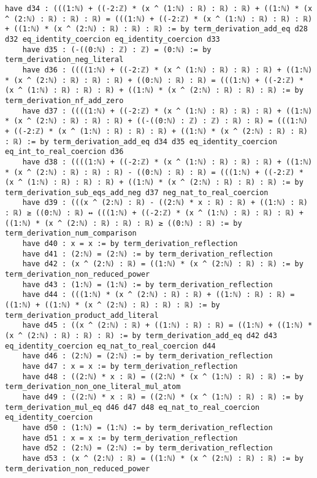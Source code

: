\documentclass{article}
\begin{document}
\begin{tcolorbox}[colback=white!10, width=\linewidth]
\begin{lstlisting}[language=Lean4]
    have d34 : (((1:ℕ) + ((-2:ℤ) * (x ^ (1:ℕ) : ℝ) : ℝ) : ℝ) + ((1:ℕ) * (x ^ (2:ℕ) : ℝ) : ℝ) : ℝ) = (((1:ℕ) + ((-2:ℤ) * (x ^ (1:ℕ) : ℝ) : ℝ) : ℝ) + ((1:ℕ) * (x ^ (2:ℕ) : ℝ) : ℝ) : ℝ) := by term_derivation_add_eq d28 d32 eq_identity_coercion eq_identity_coercion d33
    have d35 : (-((0:ℕ) : ℤ) : ℤ) = (0:ℕ) := by term_derivation_neg_literal
    have d36 : ((((1:ℕ) + ((-2:ℤ) * (x ^ (1:ℕ) : ℝ) : ℝ) : ℝ) + ((1:ℕ) * (x ^ (2:ℕ) : ℝ) : ℝ) : ℝ) + ((0:ℕ) : ℝ) : ℝ) = (((1:ℕ) + ((-2:ℤ) * (x ^ (1:ℕ) : ℝ) : ℝ) : ℝ) + ((1:ℕ) * (x ^ (2:ℕ) : ℝ) : ℝ) : ℝ) := by term_derivation_nf_add_zero
    have d37 : ((((1:ℕ) + ((-2:ℤ) * (x ^ (1:ℕ) : ℝ) : ℝ) : ℝ) + ((1:ℕ) * (x ^ (2:ℕ) : ℝ) : ℝ) : ℝ) + ((-((0:ℕ) : ℤ) : ℤ) : ℝ) : ℝ) = (((1:ℕ) + ((-2:ℤ) * (x ^ (1:ℕ) : ℝ) : ℝ) : ℝ) + ((1:ℕ) * (x ^ (2:ℕ) : ℝ) : ℝ) : ℝ) := by term_derivation_add_eq d34 d35 eq_identity_coercion eq_int_to_real_coercion d36
    have d38 : ((((1:ℕ) + ((-2:ℤ) * (x ^ (1:ℕ) : ℝ) : ℝ) : ℝ) + ((1:ℕ) * (x ^ (2:ℕ) : ℝ) : ℝ) : ℝ) - ((0:ℕ) : ℝ) : ℝ) = (((1:ℕ) + ((-2:ℤ) * (x ^ (1:ℕ) : ℝ) : ℝ) : ℝ) + ((1:ℕ) * (x ^ (2:ℕ) : ℝ) : ℝ) : ℝ) := by term_derivation_sub_eqs_add_neg d37 neg_nat_to_real_coercion
    have d39 : (((x ^ (2:ℕ) : ℝ) - ((2:ℕ) * x : ℝ) : ℝ) + ((1:ℕ) : ℝ) : ℝ) ≥ ((0:ℕ) : ℝ) ↔ (((1:ℕ) + ((-2:ℤ) * (x ^ (1:ℕ) : ℝ) : ℝ) : ℝ) + ((1:ℕ) * (x ^ (2:ℕ) : ℝ) : ℝ) : ℝ) ≥ ((0:ℕ) : ℝ) := by term_derivation_num_comparison
    have d40 : x = x := by term_derivation_reflection
    have d41 : (2:ℕ) = (2:ℕ) := by term_derivation_reflection
    have d42 : (x ^ (2:ℕ) : ℝ) = ((1:ℕ) * (x ^ (2:ℕ) : ℝ) : ℝ) := by term_derivation_non_reduced_power
    have d43 : (1:ℕ) = (1:ℕ) := by term_derivation_reflection
    have d44 : (((1:ℕ) * (x ^ (2:ℕ) : ℝ) : ℝ) + ((1:ℕ) : ℝ) : ℝ) = ((1:ℕ) + ((1:ℕ) * (x ^ (2:ℕ) : ℝ) : ℝ) : ℝ) := by term_derivation_product_add_literal
    have d45 : ((x ^ (2:ℕ) : ℝ) + ((1:ℕ) : ℝ) : ℝ) = ((1:ℕ) + ((1:ℕ) * (x ^ (2:ℕ) : ℝ) : ℝ) : ℝ) := by term_derivation_add_eq d42 d43 eq_identity_coercion eq_nat_to_real_coercion d44
    have d46 : (2:ℕ) = (2:ℕ) := by term_derivation_reflection
    have d47 : x = x := by term_derivation_reflection
    have d48 : ((2:ℕ) * x : ℝ) = ((2:ℕ) * (x ^ (1:ℕ) : ℝ) : ℝ) := by term_derivation_non_one_literal_mul_atom
    have d49 : ((2:ℕ) * x : ℝ) = ((2:ℕ) * (x ^ (1:ℕ) : ℝ) : ℝ) := by term_derivation_mul_eq d46 d47 d48 eq_nat_to_real_coercion eq_identity_coercion
    have d50 : (1:ℕ) = (1:ℕ) := by term_derivation_reflection
    have d51 : x = x := by term_derivation_reflection
    have d52 : (2:ℕ) = (2:ℕ) := by term_derivation_reflection
    have d53 : (x ^ (2:ℕ) : ℝ) = ((1:ℕ) * (x ^ (2:ℕ) : ℝ) : ℝ) := by term_derivation_non_reduced_power

\end{lstlisting}
\end{tcolorbox}
\end{document}
